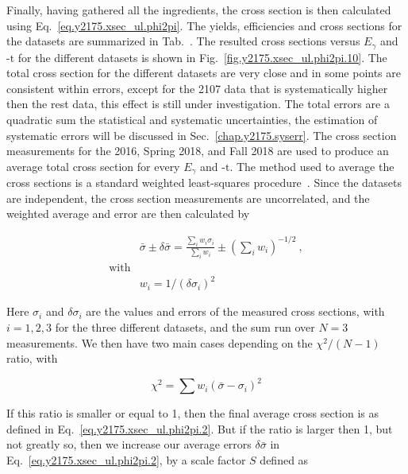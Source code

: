 Finally, having gathered all the ingredients, the cross section is then calculated using Eq.~\ref{eq.y2175.xsec_ul.phi2pi}. The yields, efficiencies and cross sections for the datasets are summarized in Tab.~. The resulted cross sections versus $E_{\gamma}$ and $\mbox{-t}$ for the different datasets is shown in Fig.~\ref{fig.y2175.xsec_ul.phi2pi.10}. The total cross section for the different datasets are very close and in some points are consistent within errors, except for the 2107 data that is systematically higher then the rest data, this effect is still under investigation. The total errors are a quadratic sum the statistical and systematic uncertainties, the estimation of systematic errors will be discussed in Sec.~\ref{chap.y2175.syserr}. The cross section measurements for the 2016, Spring 2018, and Fall 2018 are used to produce an average total cross section for every $E_{\gamma}$ and $\mbox{-t}$. The method used to average the cross sections is a standard weighted least-squares procedure~\cite{Tanabashi18}. Since the datasets are independent, the cross section measurements are uncorrelated, and the weighted average and error are then calculated by

\begin{equation}
    \label{eq.y2175.xsec_ul.phi2pi.2}
    \begin{aligned}
        & \bar{\sigma} \pm \delta\bar{\sigma} = \frac{\sum_{i}w_{i}\sigma_{i}}{\sum_{i}w_{i}} \pm  \left(\sum_{i}w_{i}\right)^{-1/2}~, \\
        \mathrm{with}\\
        & w_{i} = 1/(\delta \sigma_{i})^2
    \end{aligned}
\end{equation}

\noindent Here $\sigma_{i}$ and $\delta \sigma_{i}$ are the values and errors of the measured cross sections, with $i=1,2,3$ for the three different datasets, and the sum run over $N=3$ measurements. We then have two main cases depending on the $\chi^{2}/(N-1)$ ratio, with 

\begin{equation}
    \label{eq.y2175.xsec_ul.phi2pi.3}
    \chi^{2} = \sum w_{i}(\bar{\sigma}-\sigma_{i})^2
\end{equation}

If this ratio is smaller or equal to 1, then the final average cross section is as defined in Eq.~\ref{eq.y2175.xsec_ul.phi2pi.2}. But if the ratio is larger then 1, but not greatly so, then we increase our average errors $\delta\bar{\sigma}$ in Eq.~\ref{eq.y2175.xsec_ul.phi2pi.2}, by a scale factor $S$ defined as

